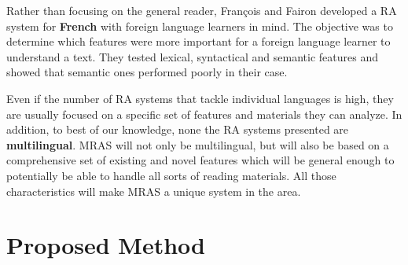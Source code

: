 \documentclass{bsu-ms}
\begin{document}

Rather than focusing on the general reader,  Fran{\c{c}}ois and Fairon \cite{franccois2012ai} developed a RA system for \textbf{French} with foreign language learners in mind. The objective was to determine which features were more important for a foreign language learner to understand a text. They tested lexical, syntactical and semantic features and showed that semantic ones performed poorly in their case.




Even if the number of RA systems that tackle individual languages is high, they are usually focused on a specific set of features and materials they can analyze. In addition, to best of our knowledge, none the RA systems presented are \textbf{multilingual}. MRAS will not only be multilingual, but will also be based on a comprehensive set of existing and novel features which will be general enough to potentially be able to handle all sorts of reading materials. All those characteristics will make MRAS a unique system in the area.






\chapter{Proposed Method}
\end{document}
